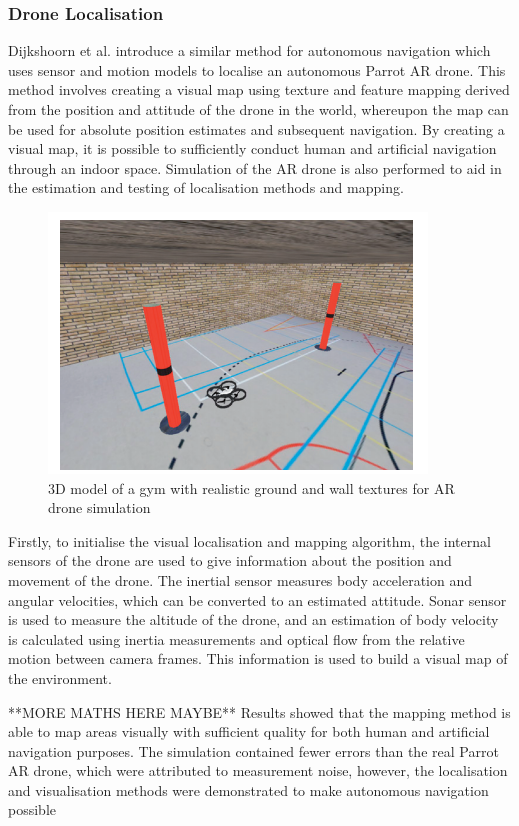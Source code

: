 \subsubsection{Drone Localisation}
Dijkshoorn et al. \cite{dijkshoorn2011} introduce a similar method for autonomous navigation which uses sensor and motion models to localise an autonomous Parrot AR drone. This method involves creating a visual map using texture and feature mapping derived from the position and attitude of the drone in the world, whereupon the map can be used for absolute position estimates and subsequent navigation. By creating a visual map, it is possible to sufficiently conduct human and artificial navigation through an indoor space. Simulation of the AR drone is also performed to aid in the estimation and testing of localisation methods and mapping.

\begin{figure}
\centering	
\includegraphics[scale=0.7]{img/dronemod}	
\caption{3D model of a gym with realistic ground and wall textures for AR drone simulation}
\end{figure}

Firstly, to initialise the visual localisation and mapping algorithm, the internal sensors of the drone are used to give information about the position and movement of the drone. The inertial sensor measures body acceleration and angular velocities, which can be converted to an estimated attitude. Sonar sensor is used to measure the altitude of the drone, and an estimation of body velocity is calculated using inertia measurements and optical flow from the relative motion between camera frames. This information is used to build a visual map of the environment.

**MORE MATHS HERE MAYBE**
Results showed that the mapping method is able to map areas visually with sufficient quality for both human and artificial navigation purposes. The simulation contained fewer errors than the real Parrot AR drone, which were attributed to measurement noise, however, the localisation and visualisation methods were demonstrated to make autonomous navigation possible

